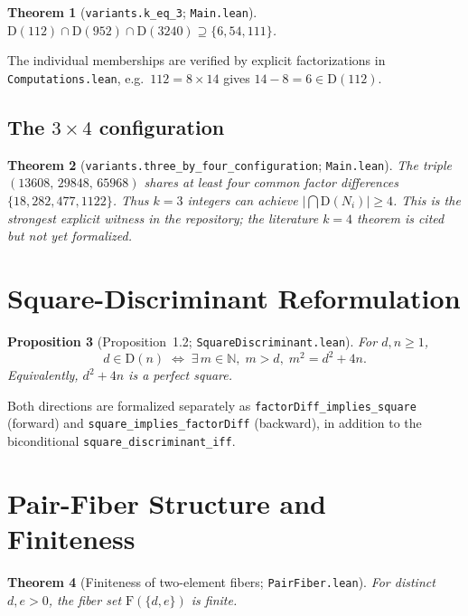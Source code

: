 \documentclass[11pt,a4paper]{article}
\newtheorem{theorem}{Theorem}[section]
\newtheorem{proposition}[theorem]{Proposition}
\theoremstyle{definition}
\theoremstyle{remark}
\newcommand{\NN}{\mathbb{N}}
\newcommand{\factorDiff}{\mathrm{D}}
\newcommand{\fiberSet}{\mathrm{F}}
\begin{document}
\begin{theorem}[\texttt{variants.k\_eq\_3}; \texttt{Main.lean}]
$\factorDiff(112)\cap\factorDiff(952)\cap\factorDiff(3240)\supseteq\{6,54,111\}$.
\end{theorem}

The individual memberships are verified by explicit factorizations in
\texttt{Computations.lean}, e.g.\ $112 = 8\times 14$ gives
$14-8=6\in\factorDiff(112)$.

\subsection{The $3\times 4$ configuration}

\begin{theorem}[\texttt{variants.three\_by\_four\_configuration}; \texttt{Main.lean}]\label{thm:3x4}
The triple $(13608,\,29848,\,65968)$ shares at least four common factor
differences $\{18,282,477,1122\}$.  Thus $k=3$ integers can achieve
$\lvert\bigcap\factorDiff(N_i)\rvert\ge 4$.
This is the strongest explicit witness in the repository; the literature
$k=4$ theorem is cited but not yet formalized.
\end{theorem}

\section{Square-Discriminant Reformulation}\label{sec:sq-disc}

\begin{proposition}[Proposition~1.2; \texttt{SquareDiscriminant.lean}]\label{prop:sq-disc}
For $d,n\ge 1$,
\[
  d\in\factorDiff(n) \;\iff\;
  \exists\, m\in\NN,\; m>d,\; m^2 = d^2 + 4n.
\]
Equivalently, $d^2+4n$ is a perfect square.
\end{proposition}

Both directions are formalized separately as
\texttt{factorDiff\_implies\_square} (forward) and
\texttt{square\_implies\_factorDiff} (backward), in addition to the
biconditional \texttt{square\_discriminant\_iff}.

\section{Pair-Fiber Structure and Finiteness}\label{sec:pairfiber}

\begin{theorem}[Finiteness of two-element fibers; \texttt{PairFiber.lean}]\label{thm:pairfiber-fin}
For distinct $d,e>0$, the fiber set $\fiberSet(\{d,e\})$ is finite.
\end{theorem}
\end{document}

